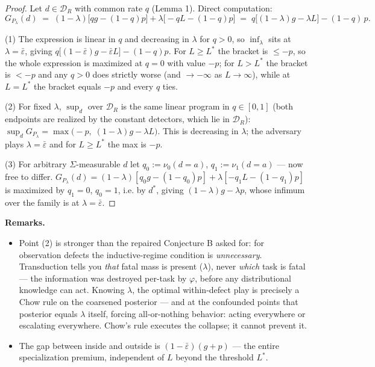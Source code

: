 \documentclass[11pt]{article}
\theoremstyle{plain}
\theoremstyle{definition}
\begin{document}
\begin{proof}
Let $d \in \mathcal{D}_R$ with common rate $q$ (Lemma 1). Direct
computation:
$$G_{P_\lambda}(d) \;=\; (1-\lambda)\big[qg - (1-q)p\big] + \lambda\big[-qL - (1-q)p\big] \;=\; q\big[(1-\lambda)g - \lambda L\big] - (1-q)\,p.$$

(1) The expression is linear in $q$ and decreasing in $\lambda$ for $q>0$, so
$\inf_\lambda$ sits at $\lambda = \bar\varepsilon$, giving
$q\big[(1-\bar\varepsilon)g - \bar\varepsilon L\big] - (1-q)p$. For
$L \geq L^*$ the bracket is $\leq -p$, so the whole expression is maximized
at $q = 0$ with value $-p$; for $L > L^*$ the bracket is $< -p$ and any
$q > 0$ does strictly worse (and $\to -\infty$ as $L \to \infty$), while at
$L = L^*$ the bracket equals $-p$ and every $q$ ties.

(2) For fixed $\lambda$, $\sup_{d}$ over $\mathcal{D}_R$ is the same linear
program in $q \in [0,1]$ (both endpoints are realized by the constant
detectors, which lie in $\mathcal{D}_R$):
$\sup_d G_{P_\lambda} = \max\big(-p,\; (1-\lambda)g - \lambda L\big)$. This is
decreasing in $\lambda$; the adversary plays $\lambda = \bar\varepsilon$ and
for $L \geq L^*$ the max is $-p$.

(3) For arbitrary $\Sigma$-measurable $d$ let $q_0 := \nu_0(d{=}a)$,
$q_1 := \nu_1(d{=}a)$ --- now free to differ. $G_{P_\lambda}(d) = (1-\lambda)[q_0 g - (1-q_0)p] + \lambda[-q_1 L - (1-q_1)p]$
is maximized by $q_1 = 0$, $q_0 = 1$, i.e. by $d^*$, giving
$(1-\lambda)g - \lambda p$, whose infimum over the family is at
$\lambda = \bar\varepsilon$.
\end{proof}

\textbf{Remarks.}
\begin{itemize}
\item Point (2) is stronger than the repaired Conjecture B asked for: for
  observation defects the inductive-regime condition is \emph{unnecessary}.
  Transduction tells you \emph{that} fatal mass is present ($\lambda$), never
  \emph{which} task is fatal --- the information was destroyed per-task by
  $\varphi$, before any distributional knowledge can act. Knowing $\lambda$,
  the optimal within-defect play is precisely a Chow rule on the coarsened
  posterior --- and at the confounded points that posterior equals $\lambda$
  itself, forcing all-or-nothing behavior: acting everywhere or escalating
  everywhere. Chow's rule executes the collapse; it cannot prevent it.
\item The gap between inside and outside is $(1-\bar\varepsilon)(g+p)$ --- the
  entire specialization premium, independent of $L$ beyond the threshold
  $L^*$.
\end{itemize}
\end{document}
